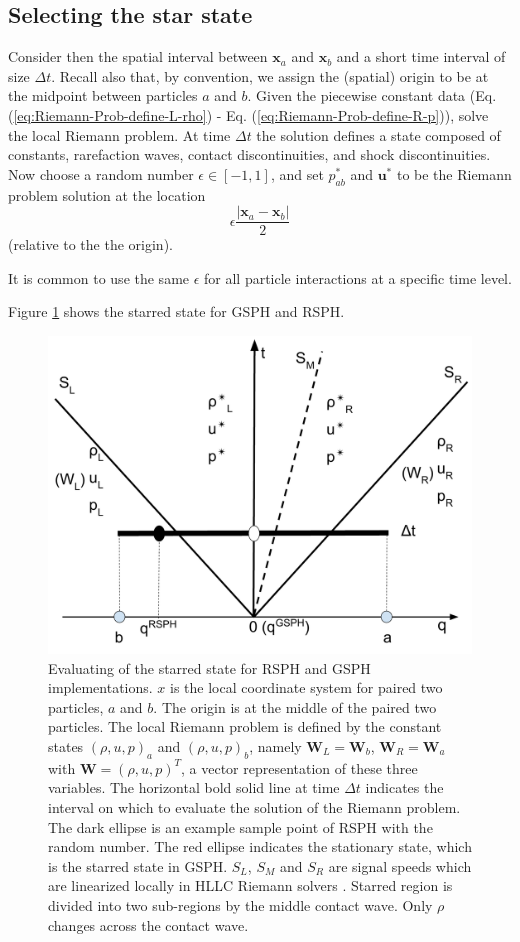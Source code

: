 \documentclass[preprint,12pt,authoryear]{elsarticle}
\begin{document}
\subsection{Selecting the star state} \label{sec:Picking-up-single-state}
Consider then the spatial interval between $\textbf{x}_{a}$ and $\textbf{x}_{ b}$ and a short time interval of size $\Delta t$. Recall also that, by convention, we assign the (spatial) origin to be at the midpoint between particles $a$ and $b$.
Given the piecewise constant data (Eq. (\ref{eq:Riemann-Prob-define-L-rho}) - Eq. (\ref{eq:Riemann-Prob-define-R-p})), solve the local Riemann problem. At time $\Delta t$ the solution defines a state composed of constants, rarefaction waves, contact discontinuities, and shock discontinuities. 
Now choose a random number $\epsilon \in [-1,1]$, and set $p_{a b}^{\ast}$ and $\textbf{u}^{\ast}$ to be the Riemann problem solution at the location 
$$
\epsilon \frac{|\textbf{x}_{a} - \textbf{x}_{ b}|}{2}
$$
(relative to the the origin).

It is common to use the same $\epsilon$ for all particle interactions at a specific time level.

Figure \ref{fig:pick-up-state-GSPH-RSPH} shows the starred state for GSPH and RSPH.
\begin{figure}[H]
    \center
	\includegraphics[width=0.5 \textwidth]{./Figures/RSPH-GSPH}
    \caption{Evaluating of the starred state for RSPH and GSPH implementations. $x$ is the local coordinate system for paired two particles, $a$ and $b$. The origin is at the middle of the paired two particles.
The local Riemann problem is defined by the constant states $(\rho, u, p)_a$ and $(\rho, u,p)_b$, namely $\textbf{W}_L = \textbf{W}_b$, $\textbf{W}_R = \textbf{W}_a$ with $\textbf{W} = (\rho, u,p)^T $, a vector representation of these three variables. The horizontal bold solid line at time $\Delta t$ indicates the interval on which to evaluate the solution of the Riemann problem. The dark ellipse is an example sample point of RSPH with the random number. The red ellipse indicates the stationary state, which is the starred state in GSPH. $S_L$, $S_M$ and $S_R$ are signal speeds which are linearized locally in HLLC Riemann solvers \citep{puri2014approximate}. Starred region is divided into two sub-regions by the middle contact wave. Only $\rho$ changes across the contact wave.}
    \label{fig:pick-up-state-GSPH-RSPH}
\end{figure}
\end{document}
